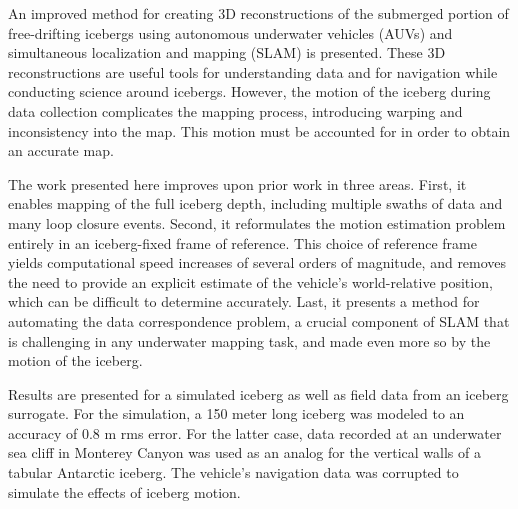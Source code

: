 
\noindent An improved method for creating 3D reconstructions of the submerged portion of free-drifting icebergs using autonomous underwater vehicles (AUVs) and simultaneous localization and mapping (SLAM) is presented. These 3D reconstructions are useful tools for understanding data and for navigation while conducting science around icebergs. However, the motion of the iceberg during data collection complicates the mapping process, introducing warping and inconsistency into the map. This motion must be accounted for in order to obtain an accurate map. 

The work presented here improves upon prior work in three areas. First, it enables mapping of the full iceberg depth, including multiple swaths of data and many loop closure events. Second, it reformulates the motion estimation problem entirely in an iceberg-fixed frame of reference. This choice of reference frame yields computational speed increases of several orders of magnitude, and removes the need to provide an explicit estimate of the vehicle's world-relative position, which can be difficult to determine accurately. Last, it presents a method for automating the data correspondence problem, a crucial component of SLAM that is challenging in any underwater mapping task, and made even more so by the motion of the iceberg.

Results are presented for a simulated iceberg as well as field data from an iceberg surrogate.  For the simulation, a 150 meter long iceberg was modeled to an accuracy of 0.8 m rms error. For the latter case, data recorded at an underwater sea cliff in Monterey Canyon was used as an analog for the vertical walls of a tabular Antarctic iceberg. The vehicle's navigation data was corrupted to simulate the effects of iceberg motion.
